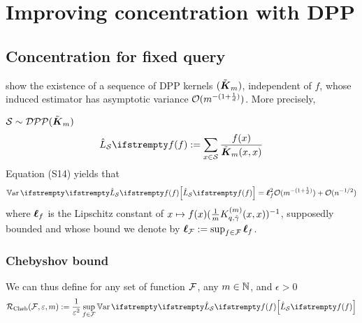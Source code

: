 

\chapter{Improving concentration with DPP}
\section{Concentration for fixed query}

\cite{bardenet2021sgddpp} show the existence of a sequence of DPP kernels $(\tilde{\boldsymbol K}_{m})$, independent of $f$, whose induced estimator has asymptotic variance $\mathcal{O}( m ^{-(1+\frac 1 d)})$. More precisely, 

\begin{tcolorbox}
	\begin{theorem}
		$\mathcal{S} \sim  \mathcal{DPP}(\tilde{\boldsymbol K}_{m})$
		\begin{equation}
			\estloss{\mathcal{S}}{\query} := \sum_{x \in \mathcal{S}} \frac{f(x)}{\opekernel{m}(x,x)}
		\end{equation}
		Equation (S14) yields that 
		\begin{equation}
			\Var{}{\estloss{\mathcal{S}}{\query}} = \lipschitz^2_\query \OO( m ^{-(1+\frac 1 d)}) +\OO( n^{-1/2})
		\end{equation}
		where $\boldsymbol\ell_f$ is the Lipschitz constant of $x \mapsto f(x) (\frac{1}{m} K^{(m)}_{q, \tilde \gamma}(x,x))^{-1}$, supposedly bounded and whose bound we denote by $\boldsymbol\ell_{\mathcal{F}} := \sup_{f \in \mathcal{F}}\boldsymbol\ell_f$.
	\end{theorem}
\end{tcolorbox}


\subsection{Chebyshov bound}

We can thus define for any set of function $\mathcal{F}$, any $m\in \mathbb{N}$, and $\epsilon>0$
\begin{equation*}
	\boundrate_{\textrm{Cheb}}(\queryset, \epsilon, m) := \frac{1}{\epsilon^2} \sup_{\query \in \queryset} \Var{}{\estloss{\mathcal{S}}{\query}}
\end{equation*}


